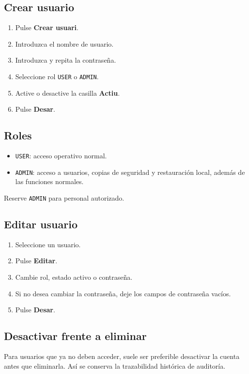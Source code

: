 \documentclass[12pt]{article}
\newcommand{\boton}[1]{\textbf{#1}}
\newcommand{\campo}[1]{\textbf{#1}}
\newcommand{\estado}[1]{\texttt{#1}}
\begin{document}
\subsection{Crear usuario}
\begin{enumerate}
  \item Pulse \boton{Crear usuari}.
  \item Introduzca el nombre de usuario.
  \item Introduzca y repita la contraseña.
  \item Seleccione rol \estado{USER} o \estado{ADMIN}.
  \item Active o desactive la casilla \campo{Actiu}.
  \item Pulse \boton{Desar}.
\end{enumerate}

\subsection{Roles}
\begin{itemize}
  \item \estado{USER}: acceso operativo normal.
  \item \estado{ADMIN}: acceso a usuarios, copias de seguridad y restauración local, además de las funciones normales.
\end{itemize}

Reserve \estado{ADMIN} para personal autorizado.

\subsection{Editar usuario}
\begin{enumerate}
  \item Seleccione un usuario.
  \item Pulse \boton{Editar}.
  \item Cambie rol, estado activo o contraseña.
  \item Si no desea cambiar la contraseña, deje los campos de contraseña vacíos.
  \item Pulse \boton{Desar}.
\end{enumerate}

\subsection{Desactivar frente a eliminar}
Para usuarios que ya no deben acceder, suele ser preferible desactivar la cuenta antes que eliminarla. Así se conserva la trazabilidad histórica de auditoría.
\end{document}
